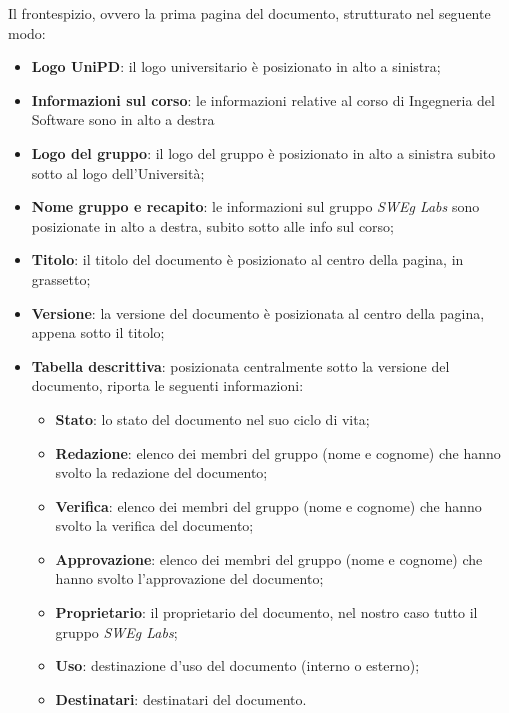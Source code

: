 Il frontespizio, ovvero la prima pagina del documento,  strutturato nel seguente modo:
\begin{itemize}
    \item \textbf{Logo UniPD}: il logo universitario è posizionato in alto a sinistra;
    \item \textbf{Informazioni sul corso}: le informazioni relative al corso di Ingegneria del Software sono in alto a destra
    \item \textbf{Logo del gruppo}: il logo del gruppo è posizionato in alto a sinistra subito sotto al logo dell'Università;
    \item \textbf{Nome gruppo e recapito}: le informazioni sul gruppo \emph{SWEg Labs} sono posizionate in alto a destra, subito sotto alle info sul corso;
    \item \textbf{Titolo}: il titolo del documento è posizionato al centro della pagina, in grassetto;
    \item \textbf{Versione}: la versione del documento è posizionata al centro della pagina, appena sotto il titolo;
    \item \textbf{Tabella descrittiva}: posizionata centralmente sotto la versione del documento, riporta le seguenti informazioni:
    \begin{itemize}
        \item \textbf{Stato}: lo stato del documento nel suo ciclo di vita;
        \item \textbf{Redazione}: elenco dei membri del gruppo (nome e cognome) che hanno svolto la redazione del documento;
        \item \textbf{Verifica}: elenco dei membri del gruppo (nome e cognome) che hanno svolto la verifica del documento;
        \item \textbf{Approvazione}: elenco dei membri del gruppo (nome e cognome) che hanno svolto l’approvazione del documento;
        \item \textbf{Proprietario}: il proprietario del documento, nel nostro caso tutto il gruppo \emph{SWEg Labs};
        \item \textbf{Uso}: destinazione d’uso del documento (interno o esterno);
        \item \textbf{Destinatari}: destinatari del documento.
    \end{itemize}
\end{itemize}


